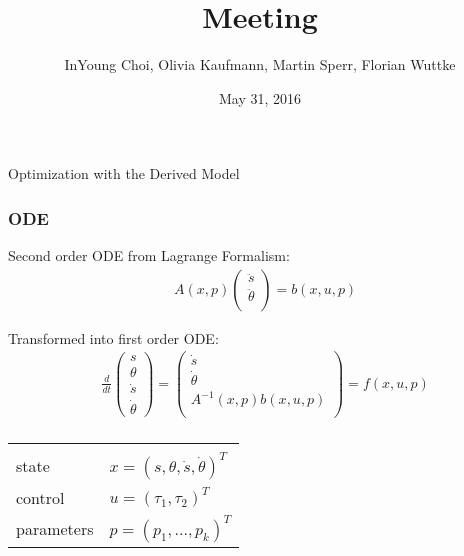 \documentclass{beamer}
\title[Kurzform]{Meeting}
\author{InYoung Choi, Olivia Kaufmann, Martin Sperr, Florian Wuttke}
\date{May 31, 2016}
\begin{document}
\begin{frame}[c]
    \begin{center}
        \large{\textcolor{TUMblau2}{Optimization with the Derived Model}}
    \end{center}
\end{frame}



\begin{frame}[c]
    \frametitle{ODE}

    Second order ODE from Lagrange Formalism:
    \begin{align*}
      &A(x,p)
      \begin{pmatrix} 
        \ddot{s} \\ \ddot{\theta} \\
      \end{pmatrix}
      = b(x,u,p)
    \end{align*}

    Transformed into first order ODE:
    \begin{align*}
      &\frac{d}{dt}
      \begin{pmatrix}
      s \\ \theta \\ \dot{s} \\ \dot{\theta}
      \end{pmatrix}
      =
      \begin{pmatrix}
        \dot{s} \\ \dot{\theta} \\ A^{-1}(x,p)b(x,u,p) \\
      \end{pmatrix} 
      = f(x,u,p) \\
    \end{align*}

    \vspace{-1.0cm}

    \begin{tabular}{ll}
      & \\
      state & $ x = (s,\theta,\dot{s},\dot{\theta})^T $ \\
      control & $ u = (\tau_1,\tau_2)^T $ \\
      parameters & $ p = (p_1,...,p_k)^T $ \\
    \end{tabular}

\end{frame}
\end{document}
